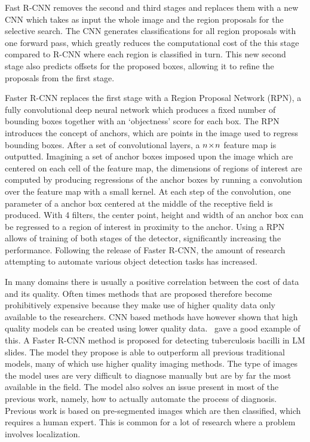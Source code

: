 Fast R-CNN removes the second and third stages and replaces them with a new CNN which takes as input the whole image and the region proposals for the selective search.
The CNN generates classifications for all region proposals with one forward pass, which greatly reduces the computational cost of the this stage compared to R-CNN where each region is classified in turn.
This new second stage also predicts offsets for the proposed boxes, allowing it to refine the proposals from the first stage.

Faster R-CNN replaces the first stage with a Region Proposal Network (RPN), a fully convolutional deep neural network which produces a fixed number of bounding boxes together with an `objectness' score for each box.
The RPN introduces the concept of anchors, which are points in the image used to regress bounding boxes.
After a set of convolutional layers, a \(n\!\times \! n\) feature map is outputted.
Imagining a set of anchor boxes imposed upon the image which are centered on each cell of the feature map, the dimensions of regions of interest are computed by producing regressions of the anchor boxes by running a convolution over the feature map with a small kernel.
At each step of the convolution, one parameter of a anchor box centered at the middle of the receptive field is produced.
With 4 filters, the center point, height and width of an anchor box can be regressed to a region of interest in proximity to the anchor.
Using a RPN allows of training of both stages of the detector, significantly increasing the performance.
Following the release of Faster R-CNN, the amount of research attempting to automate various object detection tasks has increased.

In many domains there is usually a positive correlation between the cost of data and its quality.
Often times methods that are proposed therefore become prohibitively expensive because they make use of higher quality data only available to the researchers.
CNN based methods have however shown that high quality models can be created using lower quality data.\ \textcite{el_melegy_automatic_2019} gave a good example of this.
A Faster R-CNN method is proposed for detecting tuberculosis bacilli in LM slides.
The model they propose is able to outperform all previous traditional models, many of which use higher quality imaging methods.
The type of images the model uses are very difficult to diagnose manually but are by far the most available in the field.
The model also solves an issue present in most of the previous work, namely, how to actually automate the process of diagnosis.
Previous work is based on pre-segmented images which are then classified, which requires a human expert.
This is common for a lot of research where a problem involves localization.

